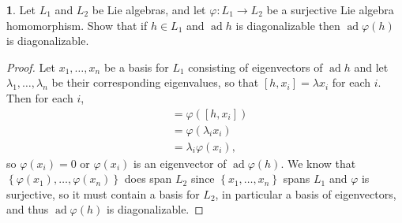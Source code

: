 \documentclass[12pt]{article}
\DeclareMathOperator{\ad}{ad}
\theoremstyle{definition}
\newtheorem{ex}{}
\begin{document}
\setcounter{ex}{6}

\begin{ex}
	Let $L_1$ and $L_2$ be Lie algebras, and let $\varphi : L_1 \to L_2$ be a surjective Lie algebra homomorphism.
	Show that if $h \in L_1$ and $\ad h$ is diagonalizable then $\ad \varphi(h)$ is diagonalizable.
\end{ex}
\begin{proof}
	Let $x_1, \dots, x_n$ be a basis for $L_1$ consisting of eigenvectors of $\ad h$ and let $\lambda_1, \dots, \lambda_n$ be their corresponding eigenvalues, so that $[h, x_i] = \lambda x_i$ for each $i$.
	Then for each $i$, \begin{align*}
		[\varphi(h), \varphi(x_i)] & = \varphi([h, x_i])      \\
		                           & = \varphi(\lambda_i x_i) \\
		                           & = \lambda_i\varphi(x_i),
	\end{align*}
	so $\varphi(x_i) = 0$ or $\varphi(x_i)$ is an eigenvector of $\ad \varphi(h)$.
	We know that $\left\lbrace\varphi(x_1), \dots, \varphi(x_n)\right\rbrace$ does span $L_2$ since $\left\lbrace x_1, \dots, x_n\right\rbrace$ spans $L_1$ and $\varphi$ is surjective, so it must contain a basis for $L_2$, in particular a basis of eigenvectors, and thus $\ad \varphi(h)$ is diagonalizable.
\end{proof}
\end{document}
